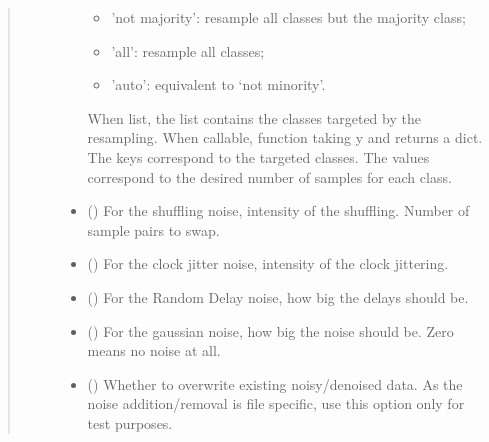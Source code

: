 \documentclass[letterpaper,10pt,english]{sphinxmanual}
\begin{document}
\begin{fulllineitems}
\begin{fulllineitems}
\begin{quote}
\begin{description}
\begin{itemize}
\begin{itemize}
\item {} 
\sphinxAtStartPar
’not majority’: resample all classes but the majority class;

\item {} 
\sphinxAtStartPar
’all’: resample all classes;

\item {} 
\sphinxAtStartPar
’auto’: equivalent to ‘not minority’.

\end{itemize}

\sphinxAtStartPar
When list, the list contains the classes targeted by the resampling.
When callable, function taking y and returns a dict. The keys correspond to the targeted classes.
The values correspond to the desired number of samples for each class.


\item {} 
\sphinxAtStartPar
{} (\sphinxstyleliteralemphasis{\sphinxupquote{, }}) \textendash{} For the shuffling noise, intensity of the shuffling. Number of sample pairs to swap.

\item {} 
\sphinxAtStartPar
{} (\sphinxstyleliteralemphasis{\sphinxupquote{, }}) \textendash{} For the clock jitter noise, intensity of the clock jittering.

\item {} 
\sphinxAtStartPar
{} (\sphinxstyleliteralemphasis{\sphinxupquote{, }}) \textendash{} For the Random Delay noise, how big the delays should be.

\item {} 
\sphinxAtStartPar
{} (\sphinxstyleliteralemphasis{\sphinxupquote{, }}) \textendash{} For the gaussian noise, how big the noise should be. Zero means no noise at all.

\item {} 
\sphinxAtStartPar
{} (\sphinxstyleliteralemphasis{\sphinxupquote{, }}) \textendash{} Whether to overwrite existing noisy/denoised data. As the noise addition/removal is
file specific, use this option only for test purposes.


\end{itemize}
\end{description}
\end{quote}
\end{fulllineitems}
\end{fulllineitems}
\end{document}
